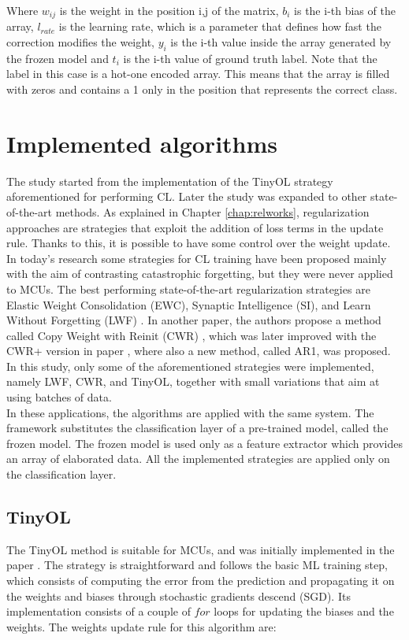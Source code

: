 \documentclass[12pt]{report}
\begin{document}
Where $w_{ij}$ is the weight in the position i,j of the matrix, $b_i$ is the i-th bias of the array, $l_{rate}$ is the learning rate, which is a parameter that defines how fast the correction modifies the weight, $y_i$ is the i-th value inside the array generated by the frozen model and $t_i$ is the i-th value of ground truth label. Note that the label in this case is a hot-one encoded array. This means that the array is filled with zeros and contains a 1 only in the position that represents the correct class.

\section{Implemented algorithms}
The study started from the implementation of the TinyOL strategy aforementioned for performing CL. Later the study was expanded to other state-of-the-art methods. As explained in Chapter \ref{chap:relworks}, regularization approaches are strategies that exploit the addition of loss terms in the update rule. Thanks to this, it is possible to have some control over the weight update. In today's research some strategies for CL training have been proposed mainly with the aim of contrasting catastrophic forgetting, but they were never applied to MCUs. The best performing state-of-the-art regularization strategies are Elastic Weight Consolidation (EWC), Synaptic Intelligence (SI), and Learn Without Forgetting (LWF) \autocite{li2017learning}. In another paper, the authors propose a method called Copy Weight with Reinit (CWR) \autocite{lomonaco2017core50}, which was later improved with the CWR+ version in paper \autocite{maltoni2019continuous}, where also a new method, called AR1, was proposed. In this study, only some of the aforementioned strategies were implemented, namely LWF, CWR, and TinyOL, together with small variations that aim at using batches of data. \\
In these applications, the algorithms are applied with the same system. The framework substitutes the classification layer of a pre-trained model, called the frozen model. The frozen model is used only as a feature extractor which provides an array of elaborated data. All the implemented strategies are applied only on the classification layer.

\subsection{TinyOL}
The TinyOL method is suitable for MCUs, and was initially implemented in the paper \autocite{ren2021tinyol}. The strategy is straightforward and follows the basic ML training step, which consists of computing the error from the prediction and propagating it on the weights and biases through stochastic gradients descend (SGD). Its implementation consists of a couple of $for$ loops for updating the biases and the weights. The weights update rule for this algorithm are:
\end{document}
